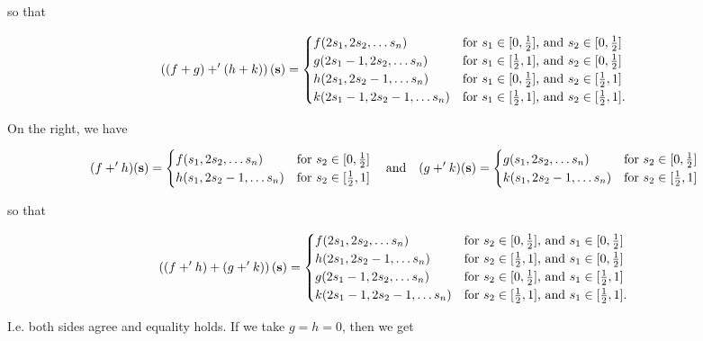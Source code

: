\documentclass{article}
\begin{document}
so that

\[\left((f+g)+'(h+k)\right)(\mathbf{s}) = \begin{cases} f(2s_{1}, 2s_{2},\ldots s_{n}) & \textnormal{for } s_{1}\in [0, \frac{1}{2}] \textnormal{, and } s_{2}\in [0, \frac{1}{2}]\\ 
g(2s_{1} - 1, 2s_{2},\ldots s_{n}) & \textnormal{for } s_{1}\in [\frac{1}{2}, 1] \textnormal{, and } s_{2}\in [0, \frac{1}{2}]\\
h(2s_{1}, 2s_{2}-1,\ldots s_{n}) & \textnormal{for } s_{1}\in [0, \frac{1}{2}] \textnormal{, and } s_{2}\in [\frac{1}{2}, 1]\\
k(2s_{1} - 1, 2s_{2}-1,\ldots s_{n}) & \textnormal{for } s_{1}\in [\frac{1}{2}, 1] \textnormal{, and } s_{2}\in [\frac{1}{2}, 1]. \end{cases} \]

On the right, we have

\[(f+'h)(\mathbf{s}) = \begin{cases} f(s_{1}, 2s_{2},\ldots s_{n}) & \textnormal{for } s_{2}\in [0, \frac{1}{2}]\\ h(s_{1}, 2s_{2} - 1,\ldots s_{n}) & \textnormal{for } s_{2}\in [\frac{1}{2}, 1] \end{cases}\quad \textnormal{and}\quad  (g+'k)(\mathbf{s}) = \begin{cases} g(s_{1}, 2s_{2},\ldots s_{n}) & \textnormal{for } s_{2}\in [0, \frac{1}{2}]\\ k(s_{1}, 2s_{2} - 1,\ldots s_{n}) & \textnormal{for } s_{2}\in [\frac{1}{2}, 1] \end{cases}
\]

so that

\[\left((f+'h)+(g+'k)\right)(\mathbf{s}) = \begin{cases} f(2s_{1}, 2s_{2},\ldots s_{n}) & \textnormal{for } s_{2}\in [0, \frac{1}{2}] \textnormal{, and } s_{1}\in [0, \frac{1}{2}]\\ 
h(2s_{1}, 2s_{2}-1,\ldots s_{n}) & \textnormal{for } s_{2}\in [\frac{1}{2}, 1] \textnormal{, and } s_{1}\in [0, \frac{1}{2}]\\
g(2s_{1}-1, 2s_{2},\ldots s_{n}) & \textnormal{for } s_{2}\in [0, \frac{1}{2}] \textnormal{, and } s_{1}\in [\frac{1}{2}, 1]\\
k(2s_{1} - 1, 2s_{2}-1,\ldots s_{n}) & \textnormal{for } s_{2}\in [\frac{1}{2}, 1] \textnormal{, and } s_{1}\in [\frac{1}{2}, 1]. \end{cases} \]

I.e. both sides agree and equality holds. If we take $g = h = 0$, then we get
\end{document}
